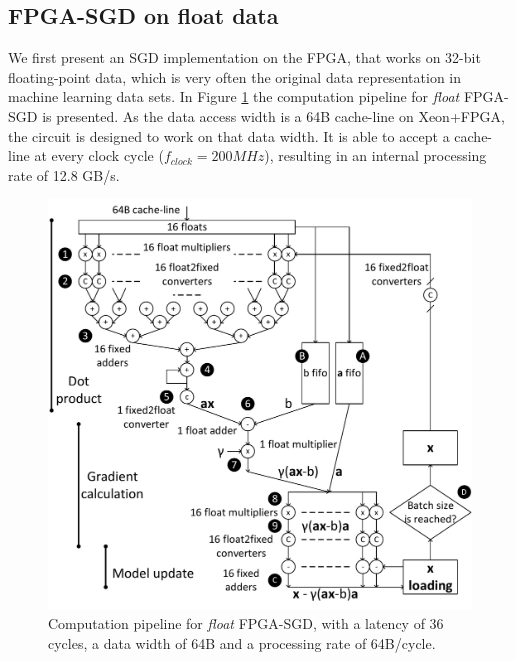 \documentclass{article}
\begin{document}
\subsection{FPGA-SGD on \textbf{float} data}
\label{section:floatfpgasgd}

We first present an SGD implementation on the FPGA, that works on 32-bit floating-point data, which is very often the original data representation in machine learning data sets. In Figure \ref{fig:floatFPGASGD} the computation pipeline for \textit{float} FPGA-SGD is presented. As the data access width is a 64B cache-line on Xeon+FPGA, the circuit is designed to work on that data width. It is able to accept a cache-line at every clock cycle ($f_{clock} = 200 MHz$), resulting in an internal processing rate of 12.8 GB/s.

\begin{figure}[t]
\centering
\includegraphics[width=.8\columnwidth]{Figures/floatFPGASGD-eps-converted-to.pdf}
\caption{Computation pipeline for \textit{float} FPGA-SGD, with a latency of 36 cycles, a data width of 64B and a processing rate of 64B/cycle.}
\label{fig:floatFPGASGD}
\end{figure}
\end{document}

